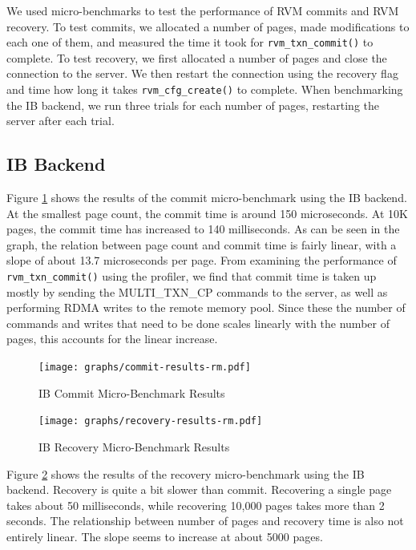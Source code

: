
We used micro-benchmarks to test the performance of RVM commits and RVM
recovery. To test commits, we allocated a number of pages, made modifications
to each one of them, and measured the time it took for \verb|rvm_txn_commit()|
to complete. To test recovery, we first allocated a number of pages and
close the connection to the server. We then restart the connection using the
recovery flag and time how long it takes \verb|rvm_cfg_create()| to complete.
When benchmarking the IB backend, we run three trials for each number of pages,
restarting the server after each trial.

\subsection{IB Backend}
Figure \ref{fig:ib-commit-ubm} shows the results of the commit micro-benchmark
using the IB backend. At the smallest page count, the commit time is around
150 microseconds. At 10K pages, the commit time has increased to 140 milliseconds.
As can be seen in the graph, the relation between page count and commit time
is fairly linear, with a slope of about 13.7 microseconds per page.
From examining the performance of \verb|rvm_txn_commit()| using the profiler,
we find that commit time is taken up mostly by sending the MULTI\_TXN\_CP
commands to the server, as well as performing RDMA writes to the remote memory
pool.  Since these the number of commands and writes that need to be done
scales linearly with the number of pages, this accounts for the linear
increase.

\begin{figure}[t!]
    \caption{IB Commit Micro-Benchmark Results}
    \texttt{[image: graphs/commit-results-rm.pdf]}
    \label{fig:ib-commit-ubm}
\end{figure}

\begin{figure}[t!]
    \caption{IB Recovery Micro-Benchmark Results}
    \texttt{[image: graphs/recovery-results-rm.pdf]}
    \label{fig:ib-recovery-ubm}
\end{figure}

Figure \ref{fig:ib-recovery-ubm} shows the results of the recovery
micro-benchmark using the IB backend. Recovery is quite a bit slower than
commit. Recovering a single page takes about 50 milliseconds, while recovering
10,000 pages takes more than 2 seconds. The relationship between number of
pages and recovery time is also not entirely linear. The slope seems to
increase at about 5000 pages.


